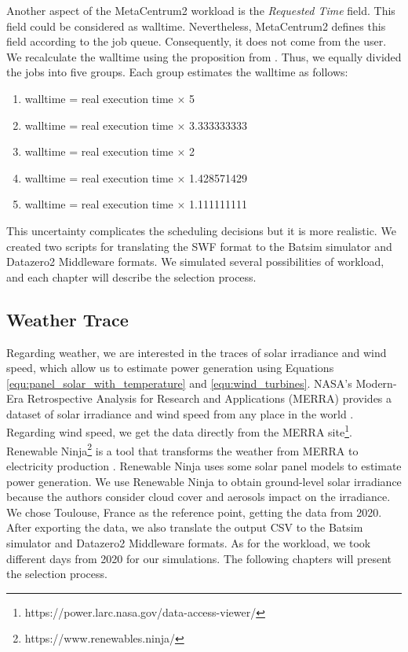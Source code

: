 Another aspect of the MetaCentrum2 workload is the \textit{Requested Time} field. This field could be considered as walltime. Nevertheless, MetaCentrum2 defines this field according to the job queue. Consequently, it does not come from the user. We recalculate the walltime using the proposition from \citeauthor{takizawa2020effect} \cite{takizawa2020effect}. Thus, we equally divided the jobs into five groups. Each group estimates the walltime as follows:

\begin{enumerate}
    \item walltime = real execution time $\times$ 5
    \item walltime = real execution time $\times$ 3.333333333
    \item walltime = real execution time $\times$ 2
    \item walltime = real execution time $\times$ 1.428571429
    \item walltime = real execution time $\times$ 1.111111111
\end{enumerate}

This uncertainty complicates the scheduling decisions but it is more realistic. We created two scripts for translating the SWF format to the Batsim simulator and Datazero2 Middleware formats. We simulated several possibilities of workload, and each chapter will describe the selection process.

\subsection{Weather Trace}
\label{sec:weather_trace}

Regarding weather, we are interested in the traces of solar irradiance and wind speed, which allow us to estimate power generation using Equations \ref{equ:panel_solar_with_temperature} and \ref{equ:wind_turbines}. NASA's Modern-Era Retrospective Analysis for Research and Applications (MERRA) provides a dataset of solar irradiance and wind speed from any place in the world \cite{rienecker2011merra}. Regarding wind speed, we get the data directly from the MERRA site\footnote{https://power.larc.nasa.gov/data-access-viewer/}. Renewable Ninja\footnote{https://www.renewables.ninja/} is a tool that transforms the weather from MERRA to electricity production \cite{pfenninger2016long, staffell2016using}. Renewable Ninja uses some solar panel models to estimate power generation. We use Renewable Ninja to obtain ground-level solar irradiance because the authors consider cloud cover and aerosols impact on the irradiance. We chose Toulouse, France as the reference point, getting the data from 2020. After exporting the data, we also translate the output CSV to the Batsim simulator and Datazero2 Middleware formats. As for the workload, we took different days from 2020 for our simulations. The following chapters will present the selection process.

